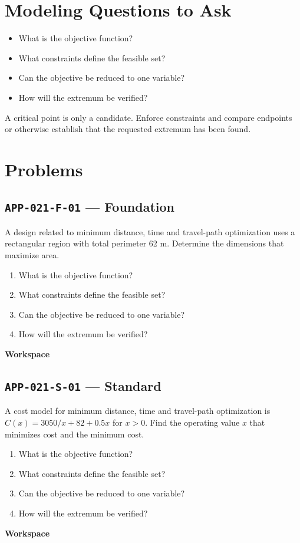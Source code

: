 \documentclass[11pt]{book}
\newcommand{\pid}[1]{\texttt{#1}}
\newcommand{\workspace}{\par\vspace{0.7in}\hrulefill\par\vspace{0.55in}\hrulefill\par}
\begin{document}
\section*{Modeling Questions to Ask}\begin{itemize}
\item What is the objective function?
\item What constraints define the feasible set?
\item Can the objective be reduced to one variable?
\item How will the extremum be verified?
\end{itemize}
\begin{errorbox}A critical point is only a candidate. Enforce constraints and compare endpoints or otherwise establish that the requested extremum has been found.\end{errorbox}
\section*{Problems}
\subsection*{\pid{APP-021-F-01} — Foundation}
\begin{problembox}
A design related to minimum distance, time and travel-path optimization uses a rectangular region with total perimeter 62 m. Determine the dimensions that maximize area.
\end{problembox}
\begin{promptbox}\begin{enumerate}
\item What is the objective function?
\item What constraints define the feasible set?
\item Can the objective be reduced to one variable?
\item How will the extremum be verified?
\end{enumerate}\end{promptbox}
\textbf{Workspace}\workspace
{}
\subsection*{\pid{APP-021-S-01} — Standard}
\begin{problembox}
A cost model for minimum distance, time and travel-path optimization is $C(x)=3050/x+82+0.5x$ for $x>0$. Find the operating value $x$ that minimizes cost and the minimum cost.
\end{problembox}
\begin{promptbox}\begin{enumerate}
\item What is the objective function?
\item What constraints define the feasible set?
\item Can the objective be reduced to one variable?
\item How will the extremum be verified?
\end{enumerate}\end{promptbox}
\textbf{Workspace}\workspace
{}
\end{document}
